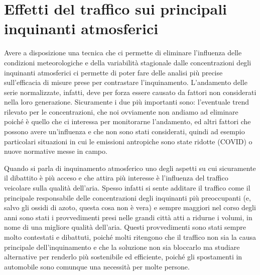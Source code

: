  

\chapter{Effetti del traffico sui principali inquinanti atmosferici}
Avere a disposizione una tecnica che ci permette di eliminare l'influenza delle condizioni meteorologiche e della variabilità stagionale dalle concentrazioni degli inquinanti atmosferici ci permette di poter fare delle analisi più precise sull'efficacia di misure prese per contrastare l'inquinamento. L'andamento delle serie normalizzate, infatti, deve per forza essere causato da fattori non considerati nella loro generazione. Sicuramente i due più importanti sono: l'eventuale trend rilevato per le concentrazioni, che noi ovviamente non andiamo ad eliminare poiché è quello che ci interessa per monitorarne l'andamento, ed altri fattori che possono avere un'influenza e che non sono stati considerati, quindi ad esempio particolari situazioni in cui le emissioni antropiche sono state ridotte (COVID) o nuove normative messe in campo.

Quando si parla di inquinamento atmosferico uno degli aspetti su cui sicuramente il dibattito è più acceso e che attira più interesse è l'influenza del traffico veicolare sulla qualità dell'aria. Spesso infatti si sente additare il traffico come il principale responsabile delle concentrazioni degli inquinanti più preoccupanti (e, salvo gli ossidi di azoto, questa cosa non è vera) e sempre maggiori nel corso degli anni sono stati i provvedimenti presi nelle grandi città atti a ridurne i volumi, in nome di una migliore qualità dell'aria. Questi provvedimenti sono stati sempre molto contestati e dibattuti, poiché molti ritengono che il traffico non sia la causa principale dell'inquinamento e che la soluzione non sia bloccarlo ma studiare alternative per renderlo più sostenibile ed efficiente, poiché gli spostamenti in automobile sono comunque una necessità per molte persone.

